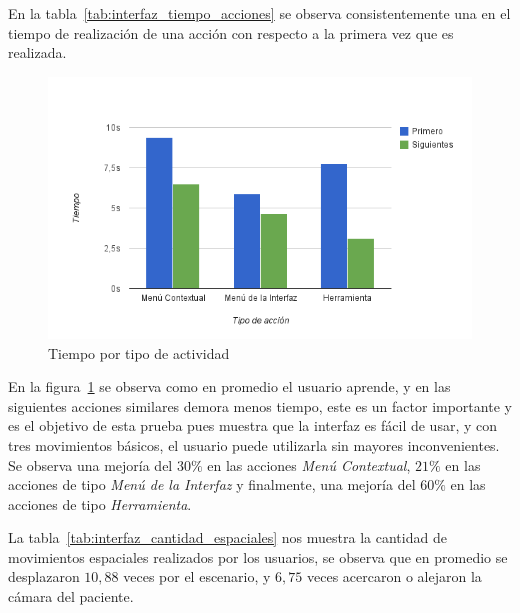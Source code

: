 En la tabla~\ref{tab:interfaz_tiempo_acciones} se observa consistentemente una
 en el tiempo de realización de una acción con
respecto a la primera vez que es realizada. 

\begin{figure}[hbt!]
\centering
\includegraphics[width=14cm]{resultados/imagenes/interfaz_tiempo_actividades.png}
\caption{Tiempo por tipo de actividad}
\label{fig:interfaz_tiempo_acciones}
\end{figure}

En la figura~\ref{fig:interfaz_tiempo_acciones} se observa como en promedio el
usuario aprende, y en las siguientes acciones similares demora menos tiempo,
este es un factor importante y es el objetivo de esta prueba pues muestra que la
interfaz es fácil de usar, y con tres movimientos básicos, el usuario puede
utilizarla sin mayores inconvenientes. Se observa una mejoría del $30\%$ en las
acciones \emph{Menú Contextual}, $21\%$ en las acciones de tipo \emph{Menú de la
    Interfaz} y finalmente, una mejoría del $60\%$ en las acciones de tipo
\emph{Herramienta}.


La tabla~\ref{tab:interfaz_cantidad_espaciales} nos muestra la cantidad de
movimientos espaciales realizados por los usuarios, se observa que en promedio
se desplazaron $10,88$ veces por el escenario, y $6,75$ veces acercaron o
alejaron la cámara del paciente.


